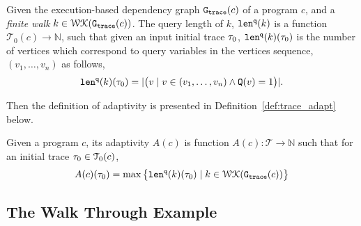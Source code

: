 \begin{defn}
\label{def:qlen}
Given 
the execution-based dependency graph $\mathtt{{G_{trace}}}({c})$ of a program $c$,
 and a \emph{finite walk} 
 $k \in \mathcal{WK}(\mathtt{{G_{trace}}}(c))$. 
The query length of $k$, $\mathtt{len}^{\tt q}(k)$ is a function $\mathcal{T}_0(c) \to \mathbb{N}$, such that given an input initial trace $\mathtt{\tau}_0$, $\mathtt{len}^{\tt q}(k)(\mathtt{\tau}_0)$ is
the number of vertices which correspond to query variables in the vertices sequence, $(v_1, \ldots, v_{n})$ as follows, 
\[
  \mathtt{len}^{\tt q}(k)(\mathtt{\tau}_0) = |\big( v \mid v \in (v_1, \ldots, v_{n}) \land \mathtt{Q}(v) = 1 \big)|.
\]
\end{defn}
Then the definition of adaptivity is presented in Definition~\ref{def:trace_adapt} below.
\begin{defn}
    \label{def:trace_adapt}
    Given a program ${c}$, 
    its adaptivity $A(c)$ is function 
    $A(c) : \mathcal{T} \to \mathbb{N}$ such that for an
    initial trace $\mathtt{\tau}_0 \in \mathcal{T}_0(c)$, 
   $$
    A(c)(\mathtt{\tau}_0) = \max \big 
    \{ \mathtt{len}^{\tt q}(k)(\mathtt{\tau}_0) \mid k \in \mathcal{WK}(\mathtt{{G_{trace}}}(c)) \big \} $$
    \end{defn}

\subsection{The Walk Through Example}
